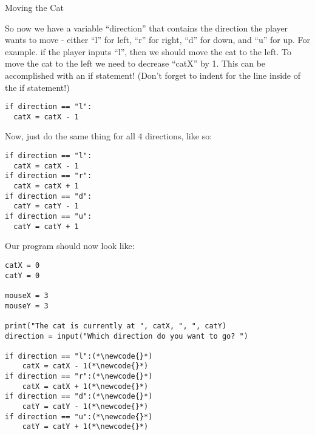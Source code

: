 \documentclass[12pt,oneside]{article}
\newcommand{\q}[1]{``#1''}
\newcommand{\subsectitle}[1]{
  \begin{flushleft}{\large#1}\end{flushleft}
}
\newcommand{\newcode}[0]{\hfill<--}
\begin{document}
\begin{minipage}{\textwidth}
\subsectitle{Moving the Cat}
So now we have a variable \q{direction} that contains the direction the player wants to move - either \q{l} for left, \q{r} for right, \q{d} for down, and \q{u} for up. For example. if the player inputs \q{l}, then we should move the cat to the left. To move the cat to the left we need to decrease \q{catX} by 1. This can be accomplished with an if statement! (Don't forget to indent for the line inside of the if statement!)

\begin{lstlisting}
if direction == "l":
  catX = catX - 1
\end{lstlisting}

Now, just do the same thing for all 4 directions, like so:

\begin{lstlisting}
if direction == "l":
  catX = catX - 1
if direction == "r":
  catX = catX + 1
if direction == "d":
  catY = catY - 1
if direction == "u":
  catY = catY + 1
\end{lstlisting}

Our program should now look like:

\begin{lstlisting}
catX = 0
catY = 0

mouseX = 3
mouseY = 3

print("The cat is currently at ", catX, ", ", catY)
direction = input("Which direction do you want to go? ")

if direction == "l":(*\newcode{}*)
    catX = catX - 1(*\newcode{}*)
if direction == "r":(*\newcode{}*)
    catX = catX + 1(*\newcode{}*)
if direction == "d":(*\newcode{}*)
    catY = catY - 1(*\newcode{}*)
if direction == "u":(*\newcode{}*)
    catY = catY + 1(*\newcode{}*)
\end{lstlisting}
\end{minipage}
\end{document}
